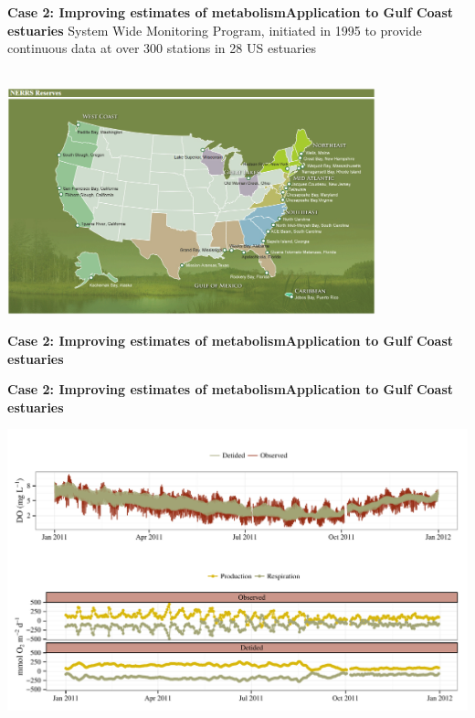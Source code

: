 \documentclass[serif]{beamer}\usepackage[]{graphicx}\usepackage[]{color}
\newenvironment{knitrout}{}{} %
\begin{document}
\begin{frame}{\textbf{Case 2: Improving estimates of metabolism}}{\textbf{Application to Gulf Coast estuaries}}
System Wide Monitoring Program, initiated in 1995 to provide continuous data at over 300 stations in 28 US estuaries \\~\\
\centerline{\includegraphics[width = 0.8\textwidth]{fig/NERRS_locations.png}}
\end{frame}



\begin{frame}{\textbf{Case 2: Improving estimates of metabolism}}{\textbf{Application to Gulf Coast estuaries}}
\begin{center}
\end{center}
\end{frame}

\begin{frame}{\textbf{Case 2: Improving estimates of metabolism}}{\textbf{Application to Gulf Coast estuaries}}
\begin{knitrout}
\color{fgcolor}

{\centering \includegraphics[width=\textwidth]{fig/dtd_met} 

}



\end{knitrout}
\end{frame}
\end{document}
